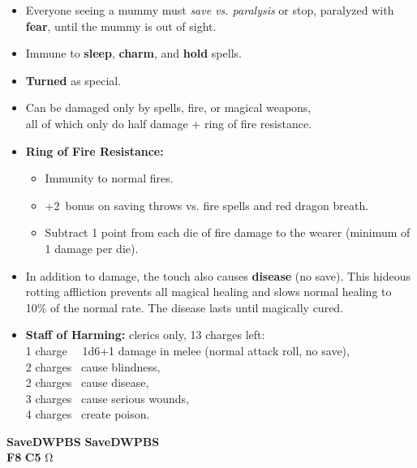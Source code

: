 \documentclass[english,11pt,openany,letterpaper,twocolumn]{book}
\begin{document}
\begin{itemize}[leftmargin=*,label=\itshape\textbullet]
	\item
	Everyone seeing a mummy must \emph{save vs. paralysis} or stop, paralyzed with \textbf{fear}, until the mummy is out of sight.
	\item
	Immune to \textbf{sleep}, \textbf{charm}, and \textbf{hold} spells.
	\item
	\textbf{Turned} as special.
	\item
	Can be damaged only by spells, fire, or magical weapons,\\all of which only do half damage + ring of fire resistance.
	\item
	\textbf{Ring of Fire Resistance:}
	\begin{itemize}[leftmargin=*,label=\bfseries\textbullet]
		\item Immunity to normal fires.
		\item +2~bonus on saving throws vs. fire spells and red dragon breath.
		\item Subtract 1 point from each die of fire damage to the wearer (minimum of 1 damage per die).
	\end{itemize}
	\item
	In addition to damage, the touch also causes \textbf{disease} (no save). This hideous rotting affliction prevents all magical healing and slows normal healing to 10\% of the normal rate. The disease lasts until magically cured.
	\item
	\textbf{Staff of Harming:} clerics only, 13 charges left:\\
		1 charge ~\dash\ 1d6+1 damage in melee (normal attack roll, no save),\\
		2 charges \dash\ cause blindness,\\
		2 charges \dash\ cause disease,\\
		3 charges \dash\ cause serious wounds,\\
		4 charges \dash\ create poison.\\
\end{itemize}

\vfill


\tab
\overprintw[24\charwidth]{\_}%
\textbf{Save\tab D\tab W\tab P\tab B\tab S}\tab
\overprintw[24\charwidth]{\_}%
\textbf{Save\tab D\tab W\tab P\tab B\tab S}\\

\tab\textbf{F8}
\tab\textbf{C5}
\hfill Ω

\end{document}
